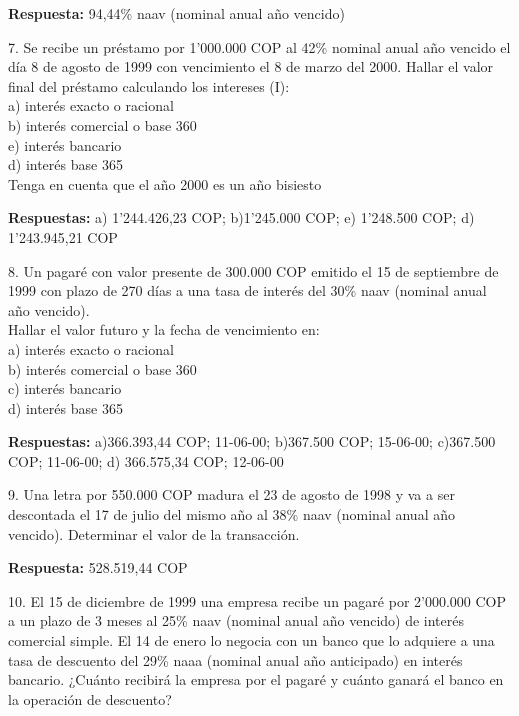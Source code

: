       \textbf{Respuesta: }94,44\% naav (nominal anual año vencido)
       \medskip

 \item 7. Se recibe un préstamo por 1’000.000 COP al 42\% nominal anual año vencido el día 8 de agosto de 1999 con vencimiento el 8 de marzo del 2000. Hallar el valor final del préstamo calculando los intereses (I):\\

       a) interés exacto o racional\\
       b) interés comercial o base 360\\
       e) interés bancario\\
       d) interés base 365\\
       Tenga en cuenta que el año 2000 es un año bisiesto
       
       \textbf{ Respuestas:} a) 1’244.426,23 COP; b)1’245.000 COP; e) 1’248.500 COP; d) 1’243.945,21 COP 
       \medskip

 \item 8. Un pagaré con valor presente de 300.000 COP  emitido el 15 de septiembre de 1999 con plazo de 270 días a una tasa de interés del 30\% naav (nominal anual año vencido).\\
       Hallar el valor futuro y la fecha de vencimiento en:\\

       a) interés exacto o racional\\
       b) interés comercial o base 360\\
       c) interés bancario\\
       d) interés base 365
       
       \textbf{Respuestas:} a)366.393,44 COP; 11-06-00; b)367.500 COP; 15-06-00; c)367.500 COP; 11-06-00; d) 366.575,34 COP; 12-06-00
       \medskip

 \item 9. Una letra por 550.000 COP madura el 23 de agosto de 1998 y va a ser descontada el 17 de julio del mismo año al 38\%  naav (nominal anual año vencido). Determinar el valor de la transacción.
 
       \textbf{Respuesta:} 528.519,44 COP 
       \medskip

 \item 10. El 15 de diciembre de 1999 una empresa recibe un pagaré por 2’000.000 COP a un plazo de 3 meses al 25\% naav (nominal anual año vencido) de interés comercial simple. El 14 de enero lo negocia con un banco que lo adquiere a una tasa de descuento del 29\% naaa (nominal anual año anticipado) en interés bancario. ¿Cuánto recibirá la empresa por el pagaré y cuánto ganará el banco en la operación de descuento?

